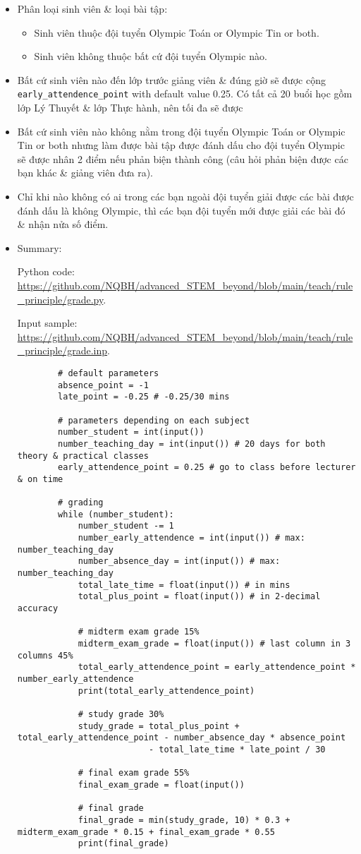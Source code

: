 \documentclass{article}
\begin{document}
\begin{itemize}
	\item Phân loại sinh viên \& loại bài tập:
	\begin{itemize}
		\item Sinh viên thuộc đội tuyển Olympic Toán or Olympic Tin or both.
		\item Sinh viên không thuộc bất cứ đội tuyển Olympic nào.
	\end{itemize}
	\item Bất cứ sinh viên nào đến lớp trước giảng viên \& đúng giờ sẽ được cộng \verb|early_attendence_point| with default value 0.25. Có tất cả 20 buổi học gồm lớp Lý Thuyết \& lớp Thực hành, nên tối đa sẽ được 
	\item Bất cứ sinh viên nào không nằm trong đội tuyển Olympic Toán or Olympic Tin or both nhưng làm được bài tập được đánh dấu cho đội tuyển Olympic sẽ được nhân 2 điểm nếu phản biện thành công (câu hỏi phản biện được các bạn khác \& giảng viên đưa ra).
	\item Chỉ khi nào không có ai trong các bạn ngoài đội tuyển giải được các bài được đánh dấu là không Olympic, thì các bạn đội tuyển mới được giải các bài đó \& nhận nửa số điểm.	
	\item Summary:
	
	Python code: \url{https://github.com/NQBH/advanced_STEM_beyond/blob/main/teach/rule_principle/grade.py}.
	
	Input sample: \url{https://github.com/NQBH/advanced_STEM_beyond/blob/main/teach/rule_principle/grade.inp}.
	\begin{verbatim}
		# default parameters
		absence_point = -1
		late_point = -0.25 # -0.25/30 mins
		
		# parameters depending on each subject
		number_student = int(input())
		number_teaching_day = int(input()) # 20 days for both theory & practical classes
		early_attendence_point = 0.25 # go to class before lecturer & on time
		
		# grading
		while (number_student):
		    number_student -= 1
		    number_early_attendence = int(input()) # max: number_teaching_day
		    number_absence_day = int(input()) # max: number_teaching_day
		    total_late_time = float(input()) # in mins
		    total_plus_point = float(input()) # in 2-decimal accuracy
		    
		    # midterm exam grade 15%
		    midterm_exam_grade = float(input()) # last column in 3 columns 45%
		    total_early_attendence_point = early_attendence_point * number_early_attendence
		    print(total_early_attendence_point)
		
		    # study grade 30%
		    study_grade = total_plus_point + total_early_attendence_point - number_absence_day * absence_point
		                  - total_late_time * late_point / 30
		
		    # final exam grade 55%
		    final_exam_grade = float(input())
		
		    # final grade
		    final_grade = min(study_grade, 10) * 0.3 + midterm_exam_grade * 0.15 + final_exam_grade * 0.55
		    print(final_grade)
	\end{verbatim}
\end{itemize}
\end{document}
